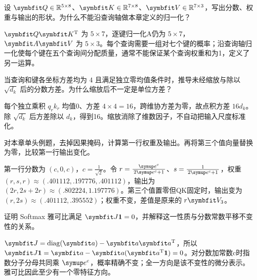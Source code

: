 
\begin{exercises}
\begin{exercise} 设 $\mat{Q}\in\Real^{5\times8}$、$\mat{K}\in\Real^{7\times8}$、$\mat{V}\in\Real^{7\times3}$，写出分数、权重与输出的形状。为什么不能沿查询轴做本章定义的归一化？

\begin{solution}
$\mat{Q}\mat{K}^{\mathrm{T}}$ 为 $5\times7$，逐键归一化A仍为 $5\times7$，$\mat{A}\mat{V}$ 为 $5\times3$。每个查询需要一组对七个键的概率；沿查询轴归一化使每个键在五个查询间分配质量，通常不能保证某个查询权重和为1，定义了另一运算。
\end{solution}
\end{exercise}

\begin{exercise} 当查询和键各坐标方差均为 $4$ 且满足独立零均值条件时，推导未经缩放与除以 $\sqrt{d_k}$ 后的分数方差。为什么缩放后不一定是单位方差？

\begin{solution}
每个独立乘积 $q_rk_r$ 均值0、方差 $4\times4=16$，跨维协方差为零，故点积方差 $16d_k$。除 $\sqrt{d_k}$ 后方差除以 $d_k$，得到16。缩放消除了维数因子，不自动把输入尺度标准化。
\end{solution}
\end{exercise}

\begin{exercise} 对本章单头例题，去掉因果掩码，计算第一行权重及输出。再将第三个值向量替换为零，比较第一行输出变化。

\begin{solution}
第一行分数为 $(c,0,c)$，$c=\frac{1}{\sqrt2}$。令 $r=\frac{\conste{}^c}{2\conste{}^c+1}$、$s=\frac{1}{2\conste{}^c+1}$，权重 $(r,s,r)\approx(.401112,.197776,.401112)$，输出为 $(2r,2s+2r)\approx(.802224,1.197776)$。第三个值置零但QK固定时，输出变为 $(r,2s)\approx(.401112,.395552)$；权重不变，差值是原来的 $r\mat{V}_3$。
\end{solution}
\end{exercise}

\begin{exercise} 证明 Softmax 雅可比满足 $\mat{J}\mathbf1=0$，并解释这一性质与分数常数平移不变性的关系。

\begin{solution}
$\mat{J}=\operatorname{diag}(\vect{a})-\vect{a}\vect{a}^{\mathrm{T}}$，所以 $\mat{J}\mathbf1=\vect{a}-\vect{a}(\vect{a}^{\mathrm{T}}\mathbf1)=0$。对分数加常数c时指数分子分母共同乘 $\conste{}^c$，概率精确不变；全一方向是该不变性的微分表示。雅可比因此至少有一个零特征方向。
\end{solution}
\end{exercise}


\end{exercises}
